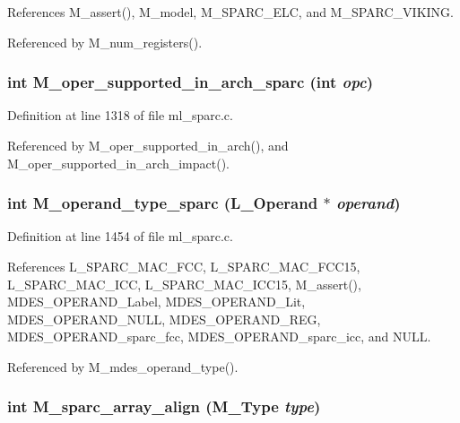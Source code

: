 References M\_\-assert(), M\_\-model, M\_\-SPARC\_\-ELC, and M\_\-SPARC\_\-VIKING.

Referenced by M\_\-num\_\-registers().
\subsubsection{\setlength{\rightskip}{0pt plus 5cm}int M\_\-oper\_\-supported\_\-in\_\-arch\_\-sparc (int {\em opc})}\label{ml__sparc_8c_336abacefae249cfb08f2ba5cfbdcb19}




Definition at line 1318 of file ml\_\-sparc.c.

Referenced by M\_\-oper\_\-supported\_\-in\_\-arch(), and M\_\-oper\_\-supported\_\-in\_\-arch\_\-impact().
\subsubsection{\setlength{\rightskip}{0pt plus 5cm}int M\_\-operand\_\-type\_\-sparc (L\_\-Operand $\ast$ {\em operand})}\label{ml__sparc_8c_55e4c4b4c94f930666fa641ef1e9ef2d}




Definition at line 1454 of file ml\_\-sparc.c.

References L\_\-SPARC\_\-MAC\_\-FCC, L\_\-SPARC\_\-MAC\_\-FCC15, L\_\-SPARC\_\-MAC\_\-ICC, L\_\-SPARC\_\-MAC\_\-ICC15, M\_\-assert(), MDES\_\-OPERAND\_\-Label, MDES\_\-OPERAND\_\-Lit, MDES\_\-OPERAND\_\-NULL, MDES\_\-OPERAND\_\-REG, MDES\_\-OPERAND\_\-sparc\_\-fcc, MDES\_\-OPERAND\_\-sparc\_\-icc, and NULL.

Referenced by M\_\-mdes\_\-operand\_\-type().
\subsubsection{\setlength{\rightskip}{0pt plus 5cm}int M\_\-sparc\_\-array\_\-align (\bf{M\_\-Type} {\em type})}\label{ml__sparc_8c_70216b50d2fd5308c7ee8c8aed9d092f}





